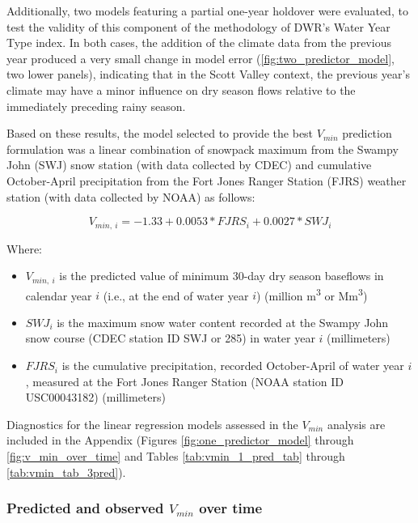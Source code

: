 \documentclass[hess, manuscript]{copernicus}
\providecommand{\tightlist}{%
  \setlength{\itemsep}{0pt}\setlength{\parskip}{0pt}}
\begin{document}
Additionally, two models featuring a partial one-year holdover were
evaluated, to test the validity of this component of the methodology of
DWR's Water Year Type index. In both cases, the addition of the climate
data from the previous year produced a very small change in model error
(\autoref{fig:two_predictor_model}, two lower panels), indicating that
in the Scott Valley context, the previous year's climate may have a
minor influence on dry season flows relative to the immediately
preceding rainy season.

Based on these results, the model selected to provide the best
\(V_{min}\) prediction formulation was a linear combination of snowpack
maximum from the Swampy John (SWJ) snow station (with data collected by
CDEC) and cumulative October-April precipitation from the Fort Jones
Ranger Station (FJRS) weather station (with data collected by NOAA) as
follows:

\begin{equation}
V_{min,~i} = -1.33 + 0.0053 * FJRS_{i}+0.0027*SWJ_{i}
\end{equation}

Where:

\begin{itemize}
\tightlist
\item
  \(V_{min,~i}\) is the predicted value of minimum 30-day dry season
  baseflows in calendar year \(i\) (i.e., at the end of water year
  \(i\)) (million m\textsuperscript{3} or Mm\textsuperscript{3})
\item
  \(SWJ_{i}\) is the maximum snow water content recorded at the Swampy
  John snow course (CDEC station ID SWJ or 285) in water year \(i\)
  (millimeters)
\item
  \(FJRS_{i}\) is the cumulative precipitation, recorded October-April
  of water year \(i\), measured at the Fort Jones Ranger Station (NOAA
  station ID USC00043182) (millimeters)
\end{itemize}

Diagnostics for the linear regression models assessed in the \(V_{min}\)
analysis are included in the Appendix (Figures
\ref{fig:one_predictor_model} through \ref{fig:v_min_over_time} and
Tables \ref{tab:vmin_1_pred_tab} through \ref{tab:vmin_tab_3pred}).

\subsubsection{\texorpdfstring{Predicted and observed \(V_{min}\) over
time}{Predicted and observed V\_\{min\} over time}}
\end{document}
